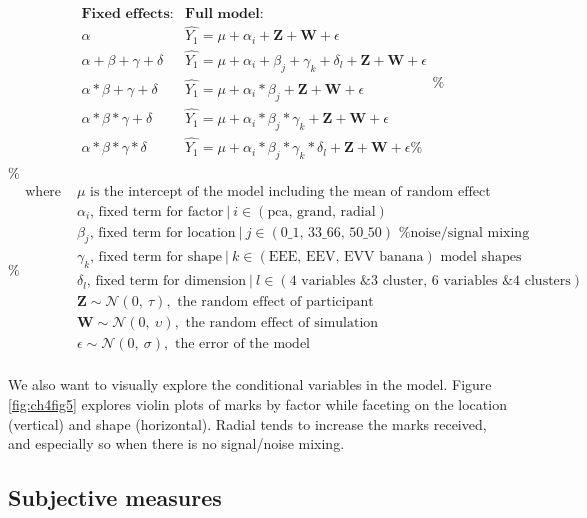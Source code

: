 \documentclass{template/monashthesis}
\begin{document}
\[
\begin{array}{ll}
\textbf{Fixed effects:}          &\textbf{Full model:} \\
\alpha                           &\widehat{Y_1} = \mu + \alpha_i + \textbf{Z} + \textbf{W} + \epsilon \\
\alpha + \beta + \gamma + \delta &\widehat{Y_1} = \mu + \alpha_i + \beta_j + \gamma_k + \delta_l + \textbf{Z} + \textbf{W} + \epsilon \\
\alpha * \beta + \gamma + \delta &\widehat{Y_1} = \mu + \alpha_i * \beta_j + \textbf{Z} + \textbf{W} + \epsilon \\
\alpha * \beta * \gamma + \delta &\widehat{Y_1} = \mu + \alpha_i * \beta_j * \gamma_k + \textbf{Z} + \textbf{W} + \epsilon \\
\alpha * \beta * \gamma * \delta &\widehat{Y_1} = \mu + \alpha_i * \beta_j * \gamma_k * \delta_l + \textbf{Z} + \textbf{W} + \epsilon
\% \end{array}
\% \]
\% \[
\% \begin{array}{ll}
\text{where } &\mu \text{ is the intercept of the model including the mean of random effect} \\
&\alpha_i \text{, fixed term for factor}~|~i\in (\text{pca, grand, radial}) \\
&\beta_j  \text{, fixed term for location}~|~j\in (\text{0\_1, 33\_66, 50\_50}) \text{ \% noise/signal mixing} \\
&\gamma_k \text{, fixed term for shape}~|~k\in (\text{EEE, EEV, EVV banana}) \text{ model shapes} \\
&\delta_l \text{, fixed term for dimension}~|~l\in (\text{4 variables \& 3 cluster, 6 variables \& 4 clusters}) \\
&\textbf{Z} \sim \mathcal{N}(0,~\tau), \text{ the random effect of participant} \\
&\textbf{W} \sim \mathcal{N}(0,~\upsilon), \text{ the random effect of simulation} \\
&\epsilon   \sim \mathcal{N}(0,~\sigma), \text{ the error of the model} \\
\end{array}
\]

We also want to visually explore the conditional variables in the model. Figure \ref{fig:ch4fig5} explores violin plots of marks by factor while faceting on the location (vertical) and shape (horizontal). Radial tends to increase the marks received, and especially so when there is no signal/noise mixing.

\hypertarget{subjective-measures}{%
\subsection{Subjective measures}\label{subjective-measures}}
\end{document}
